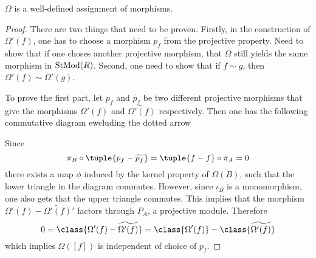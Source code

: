 \begin{lemma}
    \label{lem:stmod_omega_f_is_well_defined}
    \( \Omega \) is a well-defined assignment of morphisms.
\end{lemma}
\begin{proof}
    There are two things that need to be proven. Firstly, in the construction of \( \Omega'(f) \), one has to choose a morphism \( p_f \) from the projective property. Need to show that if one choses another projective morphism, that \( \Omega \) still yields the same morphism in \( \operatorname{StMod}(R) \). Second, one need to show that if \( f \sim g \), then \( \Omega'(f) \sim \Omega'(g) \).

    To prove the first part, let \( p_f \) and \( \widetilde{p_f} \) be two different projective morphisms that give the morphisms \( \Omega'(f) \) and \( \widetilde{\Omega'(f)} \) respectively. Then one has the following commutative diagram ewcluding the dotted arrow
    \begin{center}
    \end{center}

    Since
    \[
        \pi_B \circ \tuple{p_f - \widetilde{p_f}} = \tuple{f - f} \circ \pi_A = 0
    \]
    there exists a map \( \phi \) induced by the kernel property of \( \Omega(B) \), such that the lower triangle in the diagram commutes. However, since \( \iota_B \) is a monomorphism, one also gets that the upper triangle commutes. This implies that the morphism \( \Omega'(f) - \widetilde{\Omega'(f)}' \) factors through \( P_A \), a projective module. Therefore
    \[
        0 = \class{\Omega'(f) - \widetilde{\Omega'(f)}} = \class{\Omega'(f)} - \class{\widetilde{\Omega'(f)}}
    \]
    which implies \( \Omega([f]) \) is independent of choice of \( p_f \).


\end{proof}
